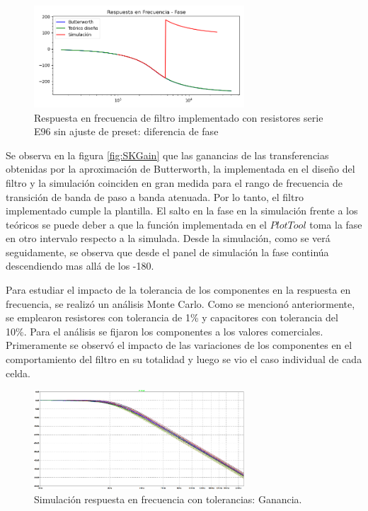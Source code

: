 \begin{figure}[H]
    \centering
    \includegraphics[width= 0.7\textwidth]{../Ejercicio2-DisenoDeCeldas/1CeldaSallenKey/images/SKphase.png}
    \caption{Respuesta en frecuencia de filtro implementado con resistores serie E96 sin ajuste de preset: diferencia de fase}
    \label{fig:SKphase}
\end{figure}

Se observa en la figura \ref{fig:SKGain} que las ganancias de las transferencias obtenidas por la aproximación de Butterworth, la implementada en el diseño del filtro y la simulación coinciden en gran medida para el rango de frecuencia de transición de banda de paso a banda atenuada. Por lo tanto, el filtro implementado cumple la plantilla. El salto en la fase en la simulación frente a los teóricos se puede deber a que la función implementada en el $Plot Tool$ toma la fase en otro intervalo respecto a la simulada. Desde la simulación, como se verá seguidamente, se observa que desde el panel de simulación la fase continúa descendiendo mas allá de los -180\circ.

Para estudiar el impacto de la tolerancia de los componentes en la respuesta en frecuencia, se realizó un análisis Monte Carlo. Como se mencionó anteriormente, se emplearon resistores con tolerancia de 1\% y capacitores con tolerancia del 10\%. Para el análisis se fijaron los componentes a los valores comerciales. Primeramente se observó el impacto de las variaciones de los componentes en el comportamiento del filtro en su totalidad y luego se vio el caso individual de cada celda. 

\begin{figure}[H]
    \centering
    \includegraphics[width= 0.7\textwidth]{../Ejercicio2-DisenoDeCeldas/1CeldaSallenKey/images/simuMagNormalizados.png}
    \caption{Simulación respuesta en frecuencia con tolerancias: Ganancia.}
    \label{fig:simugain}
\end{figure}

